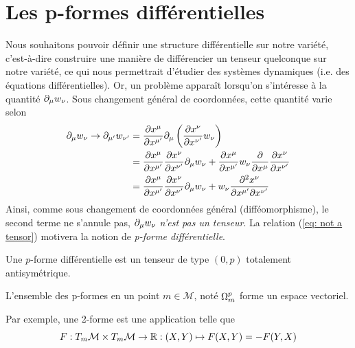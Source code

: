 \section{Les p-formes différentielles}
\label{sec:formes}
Nous souhaitons pouvoir définir une structure différentielle sur notre variété, c'est-à-dire construire une manière de différencier un tenseur quelconque sur notre variété, ce qui nous permettrait d'étudier des systèmes dynamiques (i.e. des équations différentielles). Or, un problème apparaît lorsqu'on s'intéresse à la quantité $\partial_\mu w_\nu$. Sous changement général de coordonnées, cette quantité varie selon
\begin{align}
\nonumber
    \label{eq: not a tensor}
    \partial_\mu w_\nu \to \partial_{\mu'} w_{\nu'} &= \frac{\partial x^\mu}{\partial x^{\mu'}} \partial_\mu \left( \frac{\partial x^\nu}{\partial x^{\nu'}} w_\nu \right)\\
    \nonumber
    & = \frac{\partial x^\mu}{\partial x^{\mu'}} \frac{\partial x^\nu}{\partial x^{\nu'}} \partial_\mu w_\nu + \frac{\partial x^\mu}{\partial x^{\mu'}} w_\nu \frac{\partial}{\partial x^\mu}  \frac{\partial x^\nu}{\partial x^{\nu'}}\\
    &= \frac{\partial x^\mu}{\partial x^{\mu'}} \frac{\partial x^\nu}{\partial x^{\nu'}} \partial_\mu w_\nu + w_\nu  \frac{\partial^2 x^\nu}{\partial x^{\mu'}\partial x^{\nu'}}
\end{align}
Ainsi, comme sous changement de coordonnées général (difféomorphisme), le second terme ne s'annule pas, $\partial_\mu w_\nu$ \emph{n'est pas un tenseur}. La relation (\ref{eq: not a tensor}) motivera la notion de \emph{p-forme différentielle}.
\begin{theoremframe}
    \begin{defi}
        Une $p$-forme différentielle est un tenseur de type $(0,p)$ totalement antisymétrique.
    \end{defi}
\end{theoremframe}
\begin{propri}
    L'ensemble des p-formes en un point $m\in \mathcal{M}$, noté $\displaystyle\Omega\indices*{^p_m}$ forme un espace vectoriel.
\end{propri}

Par exemple, une 2-forme est une application telle que 
\begin{equation}
    F: T_m\mathcal{M}\times T_m\mathcal{M}\rightarrow \mathbb{R}: (X, Y)\mapsto F(X, Y) = -F(Y, X)
\end{equation}

